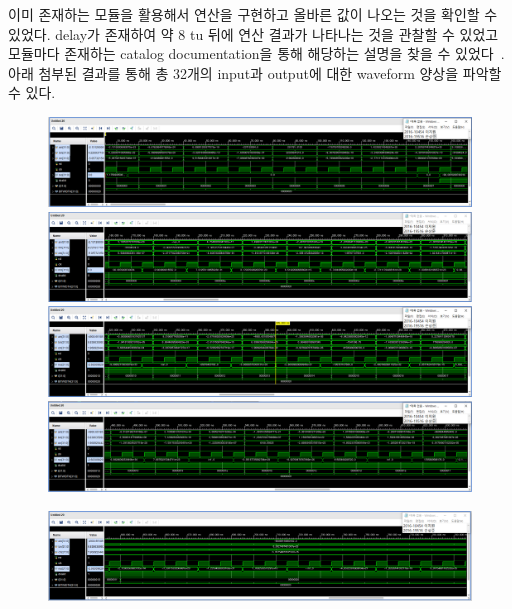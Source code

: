 \documentclass{article}
\begin{document}
이미 존재하는 모듈을 활용해서 연산을 구현하고 올바른 값이 나오는 것을 확인할 수 있었다. delay가 존재하여 약 8 tu 뒤에 연산 결과가 나타나는 것을 관찰할 수 있었고 모듈마다 존재하는 catalog documentation을 통해 해당하는 설명을 찾을 수 있었다~\cite{fpmultiplyadder}. 아래 첨부된 결과를 통해 총 32개의 input과 output에 대한 waveform 양상을 파악할 수 있다.
\begin{figure}[ht]
	\centering
	\includegraphics[width=1.0\textwidth]{../report/Waveform_32bit_FP_Multiply-Adder/tb_fp_muladd1.png}
	\includegraphics[width=1.0\textwidth]{../report/Waveform_32bit_FP_Multiply-Adder/tb_fp_muladd2.png}
	\includegraphics[width=1.0\textwidth]{../report/Waveform_32bit_FP_Multiply-Adder/tb_fp_muladd3.png}
	\includegraphics[width=1.0\textwidth]{../report/Waveform_32bit_FP_Multiply-Adder/tb_fp_muladd4.png}
\end{figure}
\begin{figure}[ht]
	\centering
	\includegraphics[width=1.0\textwidth]{../report/Waveform_32bit_FP_Multiply-Adder/tb_fp_muladd5.png}
\end{figure}
\end{document}
